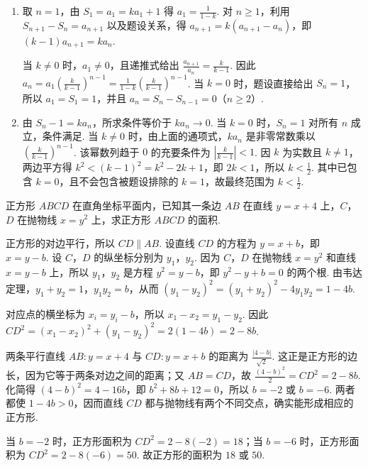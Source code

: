 \begin{solution}
\begin{enumerate}
\item 取 \(n=1\)，由 \(S_1=a_1=ka_1+1\) 得 \(a_1=\frac1{1-k}\). 对 \(n\geq1\)，利用 \(S_{n+1}-S_n=a_{n+1}\) 以及题设关系，得 \(a_{n+1}=k(a_{n+1}-a_n)\)，即 \((k-1)a_{n+1}=ka_n\).

当 \(k\ne0\) 时，\(a_1\ne0\)，且递推式给出 \(\frac{a_{n+1}}{a_n}=\frac{k}{k-1}\). 因此 \(a_n=a_1\left(\frac{k}{k-1}\right)^{n-1}=\frac1{1-k}\left(\frac{k}{k-1}\right)^{n-1}\). 当 \(k=0\) 时，题设直接给出 \(S_n=1\)，所以 \(a_1=S_1=1\)，并且 \(a_n=S_n-S_{n-1}=0\)（\(n\geq2\)）.

\item 由 \(S_n-1=ka_n\)，所求条件等价于 \(ka_n\to0\). 当 \(k=0\) 时，\(S_n=1\) 对所有 \(n\) 成立，条件满足. 当 \(k\ne0\) 时，由上面的通项式，\(ka_n\) 是非零常数乘以 \(\left(\frac{k}{k-1}\right)^{n-1}\). 该幂数列趋于 \(0\) 的充要条件为 \(\left|\frac{k}{k-1}\right|<1\). 因 \(k\) 为实数且 \(k\ne1\)，两边平方得 \(k^2<(k-1)^2=k^2-2k+1\)，即 \(2k<1\)，所以 \(k<\frac12\). 其中已包含 \(k=0\)，且不会包含被题设排除的 \(k=1\)，故最终范围为 \(k<\frac12\).
\end{enumerate}
\end{solution}

\begin{problem}
正方形 \(ABCD\) 在直角坐标平面内，已知其一条边 \(AB\) 在直线 \(y = x + 4\) 上，\(C\)，\(D\) 在抛物线 \(x = y^2\) 上，求正方形 \(ABCD\) 的面积.
\end{problem}

\begin{solution}
正方形的对边平行，所以 \(CD\parallel AB\). 设直线 \(CD\) 的方程为 \(y=x+b\)，即 \(x=y-b\). 设 \(C\)，\(D\) 的纵坐标分别为 \(y_1\)，\(y_2\). 因为 \(C\)，\(D\) 在抛物线 \(x=y^2\) 和直线 \(x=y-b\) 上，所以 \(y_1\)，\(y_2\) 是方程 \(y^2=y-b\)，即 \(y^2-y+b=0\) 的两个根. 由韦达定理，\(y_1+y_2=1\)，\(y_1y_2=b\)，从而 \((y_1-y_2)^2=(y_1+y_2)^2-4y_1y_2=1-4b\).

对应点的横坐标为 \(x_i=y_i-b\)，所以 \(x_1-x_2=y_1-y_2\). 因此 \(CD^2=(x_1-x_2)^2+(y_1-y_2)^2=2(1-4b)=2-8b\).

两条平行直线 \(AB:y=x+4\) 与 \(CD:y=x+b\) 的距离为 \(\frac{|4-b|}{\sqrt2}\). 这正是正方形的边长，因为它等于两条对边之间的距离；又 \(AB=CD\)，故 \(\frac{(4-b)^2}{2}=CD^2=2-8b\). 化简得 \((4-b)^2=4-16b\)，即 \(b^2+8b+12=0\)，所以 \(b=-2\) 或 \(b=-6\). 两者都使 \(1-4b>0\)，因而直线 \(CD\) 都与抛物线有两个不同交点，确实能形成相应的正方形.

当 \(b=-2\) 时，正方形面积为 \(CD^2=2-8(-2)=18\)；当 \(b=-6\) 时，正方形面积为 \(CD^2=2-8(-6)=50\). 故正方形的面积为 \(18\) 或 \(50\).
\end{solution}
